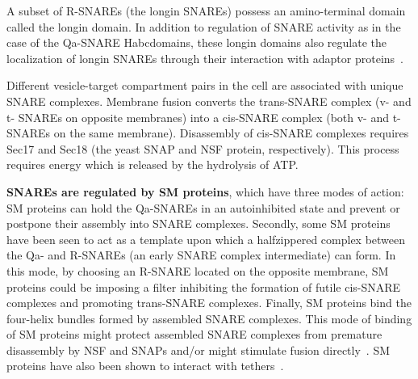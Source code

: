 A subset of R-SNAREs (the longin SNAREs) possess an amino-terminal domain called the longin domain. 
%
In addition to regulation of SNARE activity as in the case of the Qa-SNARE Habcdomains,
these longin domains also regulate the localization of longin SNAREs through their
interaction with adaptor proteins~\cite{daste2015structure}.

Different vesicle-target compartment pairs in the cell are associated with unique SNARE
complexes.
%
Membrane fusion converts the trans-SNARE complex (v- and t- SNAREs on opposite
membranes) into a cis-SNARE complex (both v- and t- SNAREs on the same membrane).
Disassembly of cis-SNARE complexes requires Sec17 and Sec18 (the yeast SNAP and NSF
protein, respectively). 
%
This process requires energy which is released by the hydrolysis of ATP.

\textbf{SNAREs are regulated by SM proteins}, which have three modes of action: SM proteins can hold
the Qa-SNAREs in an autoinhibited state and prevent or postpone their assembly into SNARE
complexes.
%
Secondly, some SM proteins have been seen to act as a template upon which a halfzippered
complex between the Qa- and R-SNAREs (an early SNARE complex intermediate) can
form. 
%
In this mode, by choosing an R-SNARE located on the opposite membrane, SM proteins
could be imposing a filter inhibiting the formation of futile cis-SNARE complexes and promoting
trans-SNARE complexes.
%
Finally, SM proteins bind the four-helix bundles formed by assembled
SNARE complexes.
%
This mode of binding of SM proteins might protect assembled SNARE
complexes from premature disassembly by NSF and SNAPs and/or might stimulate fusion directly~\cite{baker2016chaperoning}.
%
SM proteins have also been shown to interact with tethers~\cite{yoon2018snare}.

